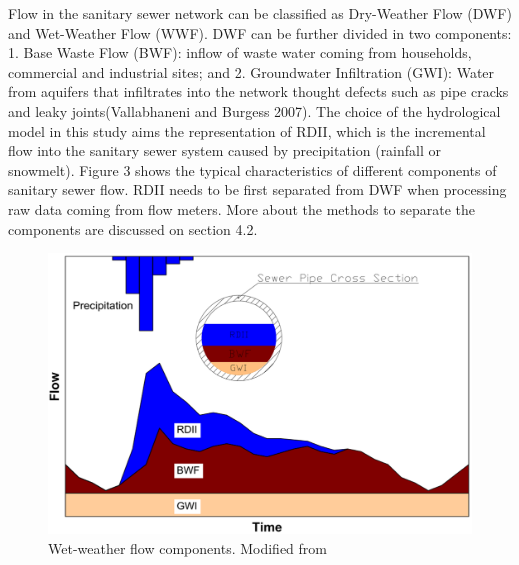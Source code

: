 



Flow in the sanitary sewer network can be classified as Dry-Weather Flow (DWF) and Wet-Weather Flow (WWF). DWF can be further divided in two components: 1. Base Waste Flow (BWF): inflow of waste water coming from households, commercial and industrial sites; and 2. Groundwater Infiltration (GWI): Water from aquifers that infiltrates into the network thought defects such as pipe cracks and leaky joints(Vallabhaneni and Burgess 2007). 
The choice of the hydrological model in this study aims the representation of RDII, which is the incremental flow into the sanitary sewer system caused by precipitation (rainfall or snowmelt). Figure 3 shows the typical characteristics of different components of sanitary sewer flow. RDII needs to be first separated from DWF when processing raw data coming from flow meters. More about the methods to separate the components are discussed on section 4.2.











\begin{figure}[h]
    \centering
	\includegraphics[scale=0.6]{figures/RDII_flows.png}
	\caption{Wet-weather flow components. Modified from \cite{Vallabhaneni2007}}
	\label{fig:flowcomponents}
\end{figure}


